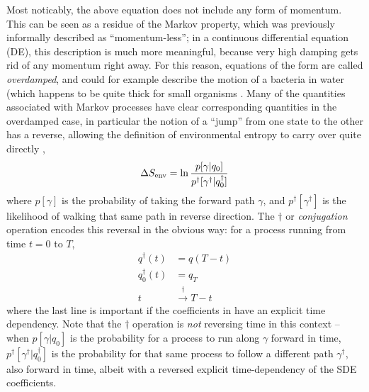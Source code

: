 Most noticably, the above equation does not include any form of momentum. This can be seen as a residue of the Markov property, which was previously informally described as ``momentum-less''; in a continuous differential equation (DE), this description is much more meaningful, because very high damping gets rid of any momentum right away. For this reason, equations of the form  are called \emph{overdamped}, and could for example describe the motion of a bacteria in water (which happens to be quite thick for small organisms \cite{sengupta}. Many of the quantities associated with Markov processes have clear corresponding quantities in the overdamped case, in particular the notion of a ``jump'' from one state to the other has a reverse, allowing the definition of environmental entropy to carry over quite directly ,
%
\begin{equation}
	\Delta S_\text{env} = \ln\frac{p[\gamma | q_0]}{p^\dagger[\gamma^\dagger | q_0^\dagger]}
\end{equation}
%
where \(p[\gamma]\) is the probability of taking the forward path \(\gamma\), and \(p^\dagger[\gamma^\dagger]\) is the likelihood of walking that same path in reverse direction. The \(\dagger\) or \emph{conjugation} operation encodes this reversal in the obvious way: for a process running from time \(t=0\) to \(T\),
%
\begin{equation}
	\begin{split}
		q^\dagger(t) &= q(T-t) \\
		q_0^\dagger(t) &= q_T \\
		t &\overset\dagger\rightarrow T-t
	\end{split}
\end{equation}
%
where the last line is important if the coefficients in  have an explicit time dependency. Note that the \(\dagger\) operation is \emph{not} reversing time in this context -- when \(p[\gamma | q_0]\) is the probability for a process to run along \(\gamma\) forward in time, \(p^\dagger[\gamma^\dagger | q_0^\dagger]\) is the probability for that same process to follow a different path \(\gamma^\dagger\), also forward in time, albeit with a reversed explicit time-dependency of the SDE coefficients. 


